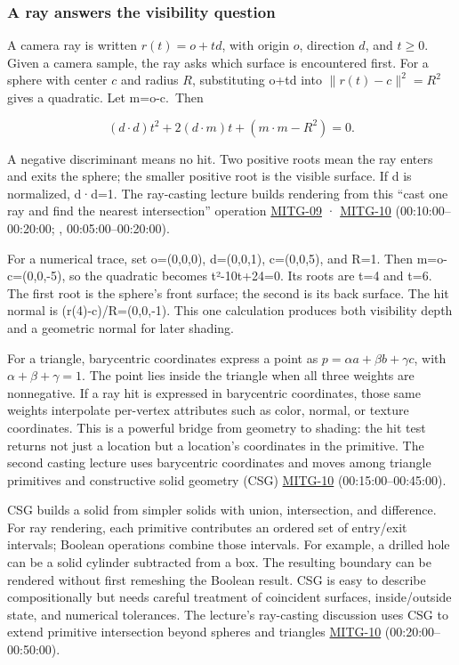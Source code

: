 \subsubsection{A ray answers the visibility question}\label{a-ray-answers-the-visibility-question}

A camera ray is written \(r(t)=o+td\), with origin \(o\), direction \(d\), and \(t\ge0\). Given a camera sample, the ray asks which surface is encountered first. For a sphere with center \(c\) and radius \(R\), substituting o+td into \(\|r(t)-c\|^2=R^2\) gives a quadratic. Let m=o-c.~Then

\[
(d\cdot d)t^2+2(d\cdot m)t+(m\cdot m-R^2)=0.
\]

A negative discriminant means no hit. Two positive roots mean the ray enters and exits the sphere; the smaller positive root is the visible surface. If d is normalized, d·d=1. The ray-casting lecture builds rendering from this ``cast one ray and find the nearest intersection'' operation \hyperref[04-visual-computing-ii-ch036]{MITG-09} · \hyperref[04-visual-computing-ii-ch036]{MITG-10} (00:10:00--00:20:00; , 00:05:00--00:20:00).

For a numerical trace, set o=(0,0,0), d=(0,0,1), c=(0,0,5), and R=1. Then m=o-c=(0,0,-5), so the quadratic becomes t²-10t+24=0. Its roots are t=4 and t=6. The first root is the sphere's front surface; the second is its back surface. The hit normal is (r(4)-c)/R=(0,0,-1). This one calculation produces both visibility depth and a geometric normal for later shading.

For a triangle, barycentric coordinates express a point as \(p=\alpha a+\beta b+\gamma c\), with \(\alpha+\beta+\gamma=1\). The point lies inside the triangle when all three weights are nonnegative. If a ray hit is expressed in barycentric coordinates, those same weights interpolate per-vertex attributes such as color, normal, or texture coordinates. This is a powerful bridge from geometry to shading: the hit test returns not just a location but a location's coordinates in the primitive. The second casting lecture uses barycentric coordinates and moves among triangle primitives and constructive solid geometry (CSG) \hyperref[04-visual-computing-ii-ch036]{MITG-10} (00:15:00--00:45:00).

CSG builds a solid from simpler solids with union, intersection, and difference. For ray rendering, each primitive contributes an ordered set of entry/exit intervals; Boolean operations combine those intervals. For example, a drilled hole can be a solid cylinder subtracted from a box. The resulting boundary can be rendered without first remeshing the Boolean result. CSG is easy to describe compositionally but needs careful treatment of coincident surfaces, inside/outside state, and numerical tolerances. The lecture's ray-casting discussion uses CSG to extend primitive intersection beyond spheres and triangles \hyperref[04-visual-computing-ii-ch036]{MITG-10} (00:20:00--00:50:00).

